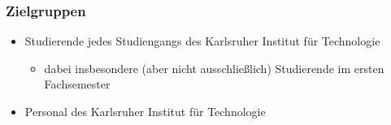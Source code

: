 \subsubsection{Zielgruppen}

\begin{itemize}
	\item Studierende jedes Studiengangs des Karlsruher Institut für Technologie
	\begin{itemize}
		\item dabei insbesondere (aber nicht ausschließlich) Studierende im ersten Fachsemester
	\end{itemize}
	\item Personal des Karlsruher Institut für Technologie
\end{itemize}